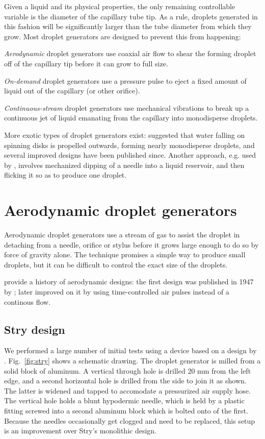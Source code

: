 \documentclass[11.5pt,oneside]{book}
\newcommand*{\figref}[1]{Fig.~\ref{#1}}
\begin{document}
Given a liquid and its physical properties, the only remaining controllable
variable is the diameter of the capillary tube tip. As a rule, droplets
generated in this fashion will be significantly larger than the tube diameter
from which they grow. Most droplet generators are designed to prevent this from
happening:
\begin{alist}
\item \emph{Aerodynamic} droplet generators use coaxial air flow to shear the
    forming droplet off of the capillary tip before it can grow to full size.
\item \emph{On-demand} droplet generators use a pressure pulse to eject a fixed
    amount of liquid out of the capillary (or other orifice).
\item \emph{Continuous-stream} droplet generators use mechanical vibrations to
    break up a continuous jet of liquid emanating from the capillary into
    monodisperse droplets.
\end{alist}
More exotic types of droplet generators exist: \citet{Walton49} suggested that
water falling on spinning disks is propelled outwards, forming nearly
monodisperse droplets, and several improved designs have been published since.
Another approach, e.g. used by \citet{Merritt77}, involves mechanized dipping of
a needle into a liquid reservoir, and then flicking it so as to produce one
droplet.

\section{Aerodynamic droplet generators}
Aerodynamic droplet generators use a stream of gas to assist the droplet in
detaching from a needle, orifice or stylus before it grows large enough to do so
by force of gravity alone. The technique promises a simple way to produce small
droplets, but it can be difficult to control the exact size of the droplets.

\citet{Allan88} provide a history of aerodynamic designs: the first design was
published in 1947 by \citet{Lane47}; \citet{Reil69} later improved on it by
using time-controlled air pulses instead of a continous flow.
\subsection{Stry design}
We performed a large number of initial tests using a device based on a design by
\citet{Stry92}. \figref{fig:stry} shows a schematic drawing. The droplet
generator is milled from a solid block of aluminum. A vertical through hole
is drilled 20 mm from the left edge, and a second horizontal hole is drilled from the side
to join it as shown. The latter is widened and tapped to accomodate a
pressurized air supply hose. The vertical hole holds a blunt hypodermic needle,
which is held by a plastic fitting screwed into a second aluminum block which is
bolted onto of the first. Because the needles occasionally get clogged and need
to be replaced, this setup is an improvement over Stry's monolithic
design. 
\end{document}
